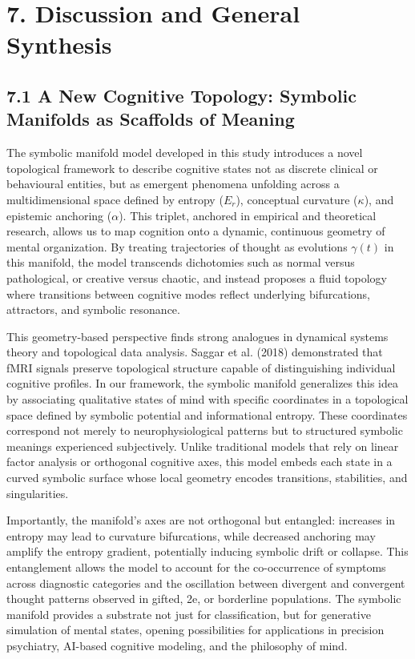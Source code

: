 \section*{7. Discussion and General Synthesis}

\subsection*{7.1 A New Cognitive Topology: Symbolic Manifolds as Scaffolds of Meaning}

The symbolic manifold model developed in this study introduces a novel topological framework to describe cognitive states not as discrete clinical or behavioural entities, but as emergent phenomena unfolding across a multidimensional space defined by entropy ($E_r$), conceptual curvature ($\kappa$), and epistemic anchoring ($\alpha$). This triplet, anchored in empirical and theoretical research, allows us to map cognition onto a dynamic, continuous geometry of mental organization. By treating trajectories of thought as evolutions $\gamma(t)$ in this manifold, the model transcends dichotomies such as normal versus pathological, or creative versus chaotic, and instead proposes a fluid topology where transitions between cognitive modes reflect underlying bifurcations, attractors, and symbolic resonance.

This geometry-based perspective finds strong analogues in dynamical systems theory and topological data analysis. Saggar et al. (2018) demonstrated that fMRI signals preserve topological structure capable of distinguishing individual cognitive profiles. In our framework, the symbolic manifold generalizes this idea by associating qualitative states of mind with specific coordinates in a topological space defined by symbolic potential and informational entropy. These coordinates correspond not merely to neurophysiological patterns but to structured symbolic meanings experienced subjectively. Unlike traditional models that rely on linear factor analysis or orthogonal cognitive axes, this model embeds each state in a curved symbolic surface whose local geometry encodes transitions, stabilities, and singularities.

Importantly, the manifold’s axes are not orthogonal but entangled: increases in entropy may lead to curvature bifurcations, while decreased anchoring may amplify the entropy gradient, potentially inducing symbolic drift or collapse. This entanglement allows the model to account for the co-occurrence of symptoms across diagnostic categories and the oscillation between divergent and convergent thought patterns observed in gifted, 2e, or borderline populations. The symbolic manifold provides a substrate not just for classification, but for generative simulation of mental states, opening possibilities for applications in precision psychiatry, AI-based cognitive modeling, and the philosophy of mind.

